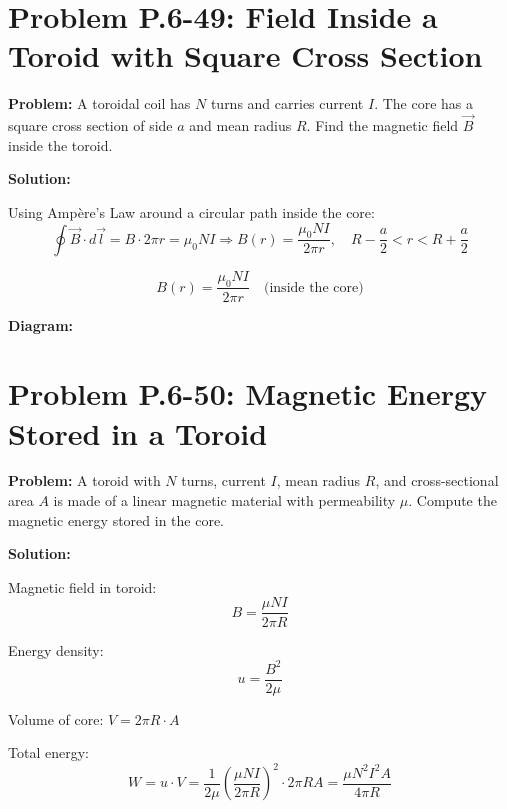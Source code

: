 \documentclass[12pt]{article}
\begin{document}
\section*{Problem P.6-49: Field Inside a Toroid with Square Cross Section}

\textbf{Problem:}  
A toroidal coil has \( N \) turns and carries current \( I \). The core has a square cross section of side \( a \) and mean radius \( R \). Find the magnetic field \( \vec{B} \) inside the toroid.

\textbf{Solution:}

Using Ampère’s Law around a circular path inside the core:
\[
\oint \vec{B} \cdot d\vec{l} = B \cdot 2\pi r = \mu_0 N I
\Rightarrow B(r) = \frac{\mu_0 N I}{2\pi r}, \quad R - \frac{a}{2} < r < R + \frac{a}{2}
\]

\begin{tcolorbox}
\[
\boxed{B(r) = \frac{\mu_0 N I}{2\pi r}} \quad \text{(inside the core)}
\]
\end{tcolorbox}

\textbf{Diagram:}
\begin{center}
\end{center}



\section*{Problem P.6-50: Magnetic Energy Stored in a Toroid}

\textbf{Problem:}  
A toroid with \( N \) turns, current \( I \), mean radius \( R \), and cross-sectional area \( A \) is made of a linear magnetic material with permeability \( \mu \). Compute the magnetic energy stored in the core.

\textbf{Solution:}

Magnetic field in toroid:
\[
B = \frac{\mu N I}{2\pi R}
\]

Energy density:
\[
u = \frac{B^2}{2\mu}
\]

Volume of core: \( V = 2\pi R \cdot A \)

Total energy:
\[
W = u \cdot V = \frac{1}{2\mu} \left( \frac{\mu N I}{2\pi R} \right)^2 \cdot 2\pi R A
= \frac{\mu N^2 I^2 A}{4\pi R}
\]
\end{document}
